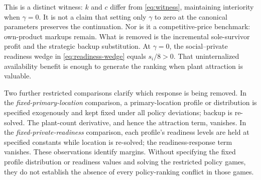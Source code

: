 This is a distinct witness: $k$ and $c$ differ from \eqref{eq:witness}, maintaining interiority when $\gamma=0$. It is not a claim that setting only $\gamma$ to zero at the canonical parameters preserves the continuation. Nor is it a competitive-price benchmark: own-product markups remain. What is removed is the incremental sole-survivor profit and the strategic backup substitution. At $\gamma=0$, the social--private readiness wedge in \eqref{eq:readiness-wedge} equals $s_i/8>0$. That uninternalized availability benefit is enough to generate the ranking when plant attraction is valuable.

Two further restricted comparisons clarify which response is being removed. In the \emph{fixed-primary-location} comparison, a primary-location profile or distribution is specified exogenously and kept fixed under all policy deviations; backup is re-solved. The plant-count derivative, and hence the attraction term, vanishes. In the \emph{fixed-private-readiness} comparison, each profile's readiness levels are held at specified constants while location is re-solved; the readiness-response term vanishes. These observations identify margins. Without specifying the fixed profile distribution or readiness values and solving the restricted policy games, they do not establish the absence of every policy-ranking conflict in those games.
